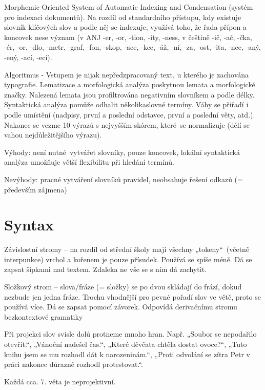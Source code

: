 \documentclass[12pt]{article}					%
\begin{document}
\begin{definice}
	Morphemic Oriented System of Automatic Indexing and Condensation (systém pro indexaci dokumentů). Na rozdíl od standardního přístupu, kdy existuje slovník klíčových slov a podle něj se indexuje, využívá toho, že řada přípon a koncovek nese význam (v ANJ -er, -or, -tion, -ity, -ness, v češtině -ič, -ač, -čka, -ér, -or, -dlo, -metr, -graf, -fon, -skop, -ace, -kce, -áž, -ní, -za, -ost, -ita, -nce, -aný, -ený, -ací, -ecí).

	Algoritmus - Vstupem je nijak nepředzpracovaný text, u kterého je zachována typografie. Lematizace a morfologická analýza poskytnou lemata a morfologické značky. Nalezená lemata jsou profiltrována negativním slovníkem a podle délky. Syntaktická analýza pomůže odhalit několikaslovné termíny. Váhy se přiřadí i podle umístění (nadpisy, první a poslední odstavce, první a poslední věty, atd.). Nakonec se vezme 10 výrazů s nejvyšším skórem, které se normalizuje (dělí se vahou nejdůležitějšího výrazu).
	
	Výhody: není nutné vytvářet slovníky, pouze koncovek, lokální syntaktická analýza umožňuje větší flexibilitu při hledání termínů.

	Nevýhody: pracné vytváření slovníků pravidel, neobsahuje řešení odkazů (= především zájmena)
\end{definice}

\section{Syntax}
\begin{definice}[Reprezentace]
	Závislostní stromy -- na rozdíl od střední školy mají všechny „tokeny“ (včetně interpunkce) vrchol a kořenem je pouze přísudek. Používá se spíše méně. Dá se zapsat šipkami nad textem. Zdaleka ne vše se s ním dá zachytit.

	Složkový strom -- slova/fráze (= složky) se po dvou skládají do frází, dokud nezbude jen jedna fráze. Trochu vhodnější pro pevné pořadí slov ve větě, proto se používá více. Dá se zapsat pomocí závorek. Odpovídá derivačnímu stromu bezkontextové gramatiky
\end{definice}

\begin{definice}
	Při projekci slov svisle dolů protneme mnoho hran. Např. „Soubor se nepodařilo otevřít.“, „Vánoční nadešel čas.“, „Které děvčata chtěla dostat ovoce?“, „Tuto knihu jsem se mu rozhodl dát k narozeninám.“, „Proti odvolání se zítra Petr v práci nakonec důrazně rozhodl protestovat.“.

	Každá cca. 7. věta je neprojektivní.
\end{definice}
\end{document}
